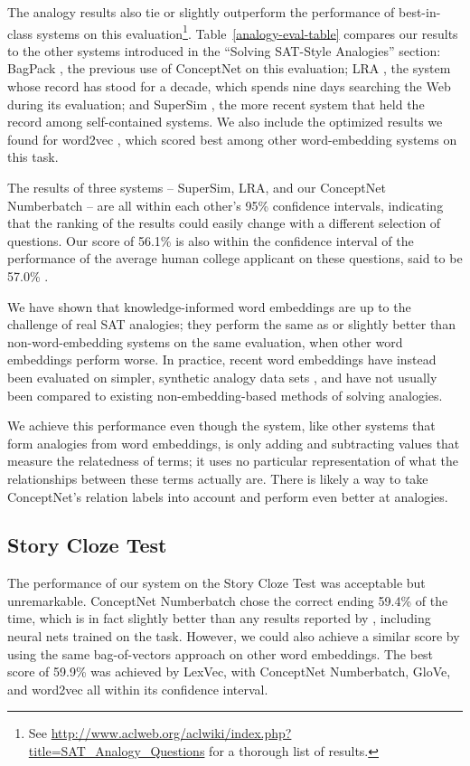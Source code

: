 \documentclass[letterpaper]{article}
\begin{document}
The analogy results also tie or slightly outperform the performance of
best-in-class systems on this evaluation\footnote{See
\url{http://www.aclweb.org/aclwiki/index.php?title=SAT_Analogy_Questions} for a
thorough list of results.}. Table~\ref{analogy-eval-table} compares our results
to the other systems introduced in the ``Solving SAT-Style Analogies'' section:
BagPack \cite{herdagdelen2009bagpack}, the previous use of ConceptNet on this
evaluation; LRA \cite{turney2006lra}, the system whose record has stood for a
decade, which spends nine days searching the Web during its evaluation; and
SuperSim \cite{turney2013supersim}, the more recent system that held the record
among self-contained systems. We also include the optimized results we found
for word2vec \cite{mikolov2013word2vec}, which scored best among other
word-embedding systems on this task.

The results of three systems -- SuperSim, LRA, and our ConceptNet Numberbatch
-- are all within each other's 95\% confidence intervals, indicating that the
ranking of the results could easily change with a different selection of
questions. Our score of 56.1\% is also within the confidence interval of the
performance of the average human college applicant on these questions, said to
be 57.0\% \cite{turney2006lra}.

We have shown that knowledge-informed word embeddings are up to the challenge
of real SAT analogies; they perform the same as or slightly better than
non-word-embedding systems on the same evaluation, when other word embeddings
perform worse. In practice, recent word embeddings have instead been evaluated
on simpler, synthetic analogy data sets \cite{mikolov2013word2vec}, and have
not usually been compared to existing non-embedding-based methods of solving
analogies.

We achieve this performance even though the system, like other systems that
form analogies from word embeddings, is only adding and subtracting values that
measure the relatedness of terms; it uses no particular representation of what
the relationships between these terms actually are. There is likely a way to
take ConceptNet's relation labels into account and perform even better at
analogies.

\subsection{Story Cloze Test}

The performance of our system on the Story Cloze Test was acceptable but
unremarkable. ConceptNet Numberbatch chose the correct ending 59.4\% of the
time, which is in fact slightly better than any results reported by
\citeauthor{mostafazadeh2016cloze} , including
neural nets trained on the task. However, we could also achieve a similar score
by using the same bag-of-vectors approach on other word embeddings. The best
score of 59.9\% was achieved by LexVec, with ConceptNet Numberbatch, GloVe, and
word2vec all within its confidence interval.
\end{document}
